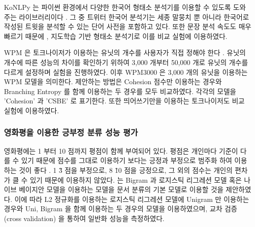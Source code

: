 \documentclass[11pt]{article}
\begin{document}
KoNLPy 는 파이썬 환경에서 다양한 한국어 형태소 분석기를 이용할 수 있도록 도와주는 라이브러리이다 \citep{konlpy}.
그 중 트위터 한국어 분석기는 세종 말뭉치 뿐 아니라 한국어로 작성된 트윗을 분석할 수 있는 단어 사전을 포함하고 있다.
또한 문장 분석 속도도 매우 빠르기 때문에 \citep{konlpy}, 지도학습 기반 형태소 분석기로 이를 비교 실험에 이용하였다.

WPM 은 토크나이저가 이용하는 유닛의 개수를 사용자가 직접 정해야 한다 \citep{wu2016google}.
유닛의 개수에 따른 성능의 차이를 확인하기 위하여 3,000 개부터 50,000 개로 유닛의 개수를 다르게 설정하며 실험을 진행하였다.
이후 WPM3000 은 3,000 개의 유닛을 이용하는 WPM 모델을 의미한다.
제안하는 방법은 Cohesion 점수만 이용하는 경우와 Branching Entropy 를 함께 이용하는 두 경우를 모두 비교하였다.
각각의 모델을 'Cohesion' 과 'CSBE' 로 표기한다.
또한 띄어쓰기만을 이용하는 토크나이저도 비교 실험에 이용하였다.

\subsubsection{영화평을 이용한 긍부정 분류 성능 평가}
영화평에는 1 부터 10 점까지 평점이 함께 부여되어 있다.
평점은 개인마다 기준이 다를 수 있기 때문에 점수를 그대로 이용하기 보다는 긍정과 부정으로 범주화 하여 이용하는 것이 좋다 \citep{pang2008opinion, pang2002thumbs}.
1 \~ 3 점을 부정으로, 8 \~ 10 점을 긍정으로, 그 외의 점수는 개인의 편차가 클 수 있기 때문에 이용하지 않았다.
\citep{wang2012baselines, joulin2016bag} 는 Bigram 과 로지스틱 리그레션 모델 혹은 나이브 베이지안 모델을 이용하는 모델을 문서 분류의 기본 모델로 이용할 것을 제안하였다.
이에 따라 L2 정규화를 이용하는 로지스틱 리그레션 모델에 Unigram 만 이용하는 경우와 Uni, Bigram 을 함께 이용하는 두 경우의 모델을 이용하였으며, 교차 검증 (cross validation) 을 통하여 일반화 성능을 측정하였다.
\end{document}
